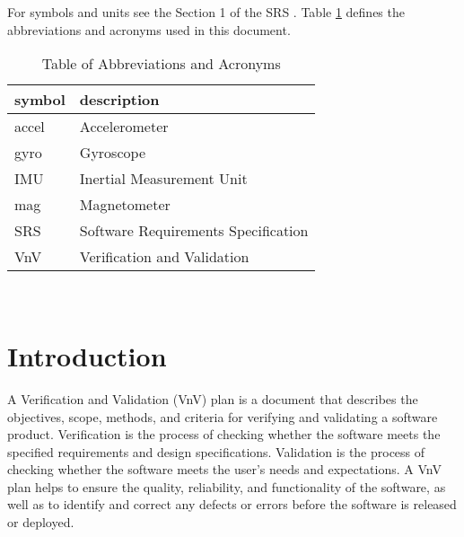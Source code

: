 \documentclass[12pt, titlepage]{article}
\begin{document}
For symbols and units see the Section 1 of the SRS \citep{SRS}. Table \ref{tab:abb} defines the
abbreviations and acronyms used in this document.


\begin{table}[!h]
  \centering
  \caption{Table of Abbreviations and Acronyms}
\renewcommand{\arraystretch}{1.2}
\begin{tabular}{l l} 
    \toprule
    \textbf{symbol} & \textbf{description}\\
    \midrule 
    accel & Accelerometer \\
    gyro & Gyroscope \\
    IMU & Inertial Measurement Unit\\
    mag & Magnetometer \\
    SRS & Software Requirements Specification\\
    VnV & Verification and Validation \\
    \bottomrule
\end{tabular}\\
\label{tab:abb}
\end{table}



\newpage


\section{Introduction}

A Verification and Validation (VnV) plan is a document that describes the objectives, scope,
methods, and criteria for verifying and validating a software product. Verification is the process
of checking whether the software meets the specified requirements and design specifications.
Validation is the process of checking whether the software meets the user's needs and expectations.
A VnV plan helps to ensure the quality, reliability, and functionality of the software, as well as
to identify and correct any defects or errors before the software is released or deployed.
\end{document}
